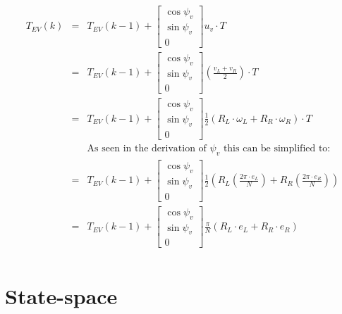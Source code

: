 \documentclass[12pt]{article}
\begin{document}
	\begin{eqnarray}
	{T}_{EV}(k) &=& {T}_{EV}(k-1) + \left[
	\begin{array}{c}
	\cos \psi_v\\
	\sin \psi_v \\
	0
	\end{array}
	\right] u_v \cdot T \nonumber \\
	&=& {T}_{EV}(k-1) + \left[
	\begin{array}{c}
	\cos \psi_v\\
	\sin \psi_v \\
	0
	\end{array}
	\right] \left( \frac{v_L + v_R}{2} \right) \cdot T \nonumber \\
	&=& {T}_{EV}(k-1) + \left[
	\begin{array}{c}
	\cos \psi_v\\
	\sin \psi_v \\
	0
	\end{array}
	\right] \frac{1}{2}(R_L\cdot\omega_L + R_R\cdot\omega_R)\cdot T \nonumber \nonumber \\
	&& \text{As seen in the derivation of $\psi_v$ this can be simplified to:}	\nonumber \\
	&=& {T}_{EV}(k-1) + \left[
	\begin{array}{c}
	\cos \psi_v\\
	\sin \psi_v \\
	0
	\end{array}
	\right] \frac{1}{2}\left(R_L\left(\frac{2\pi \cdot e_L}{N}\right) + R_R\left(\frac{2\pi \cdot e_R}{N}\right)\right) \nonumber  \\
	&=& {T}_{EV}(k-1) + \left[
	\begin{array}{c}
	\cos \psi_v\\
	\sin \psi_v \\
	0
	\end{array}
	\right] \frac{\pi}{N}(R_L\cdot e_L + R_R\cdot e_R) \\
	\nonumber \end{eqnarray}
	
	\section{State-space}
	
\end{document}
